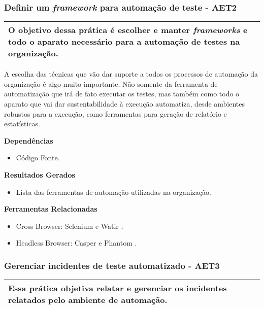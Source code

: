 \subsubsection{ Definir um \textit{framework} para automação de teste - AET2}
\label{sec:aet2}

\begin{table}[H]
\centering
\begin{tabular}{|p{130mm}|}
\hline
O objetivo dessa prática é escolher e manter \textit{frameworks} e todo o aparato necessário para a automação de testes na organização. \\ 
\hline
\end{tabular}
\end{table}

A escolha das técnicas que vão dar suporte a todos os processos de automação da organização é algo muito importante. Não somente da ferramenta de automatização que irá de fato executar os testes, mas também como todo o aparato que vai dar sustentabilidade à execução automatiza, desde ambientes robustos para a execução, como ferramentas para geração de relatório e estatísticas.

\textbf{Dependências}
\begin{itemize}
    \item Código Fonte.
\end{itemize}

\textbf{Resultados Gerados}
\begin{itemize}
    \item Lista das ferramentas de automação utilizadas na organização.
\end{itemize}

\textbf{Ferramentas Relacionadas}
\begin{itemize}
    \item Cross Browser: Selenium \cite{Selenium} e Watir \cite{Watir};
    \item Headless Browser: Casper \cite{Casper} e Phantom \cite{Phantom}.
\end{itemize}


\subsubsection{ Gerenciar incidentes de teste automatizado - AET3}
\label{sec:aet3}

\begin{table}[!ht]
\centering
\begin{tabular}{|p{130mm}|}
\hline
Essa prática objetiva relatar e gerenciar os incidentes relatados pelo ambiente de automação. \\ 
\hline
\end{tabular}
\end{table}

